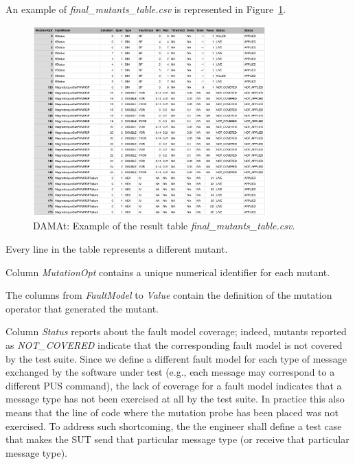 An example of \emph{final\_mutants\_table.csv} is represented in Figure~\ref{fig:damat:example:result:table}.

 \begin{figure}[h]
\begin{center}
\includegraphics[width=0.8\textwidth]{images/DAMAtADCS.png}
\caption{DAMAt: Example of the result table \emph{final\_mutants\_table.csv}.}
\label{fig:damat:example:result:table}
\end{center}
\end{figure}

Every line in the table represents a different mutant.

Column \emph{MutationOpt} contains a unique numerical identifier for each mutant.

The columns from \emph{FaultModel} to \emph{Value} contain the definition of the mutation operator that generated the mutant.

\ENDCHANGEDFINAL

Column \emph{Status} reports about  the fault model coverage; indeed, mutants reported as \emph{NOT\_COVERED} indicate that the corresponding fault model is not covered by the test suite. Since we define a different fault model for each type of message exchanged by the software under test (e.g., each message may correspond to a different PUS command), the lack of coverage for a fault model indicates that a message type has not been exercised at all by the test suite. In practice this also means that the line of code where the mutation probe has been placed was not exercised.
To address such shortcoming, the the engineer shall define a test case that makes the SUT send that particular message type (or receive that particular message type).

